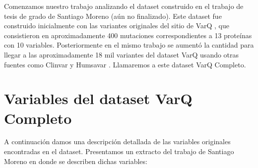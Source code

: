 
Comenzamos nuestro trabajo analizando el dataset construido en el trabajo de tesis de grado de Santiago Moreno (aún no finalizado). Este dataset fue construido inicialmente con las variantes originales del sitio de VarQ \cite{varq}, que consistieron en aproximadamente 400 mutaciones correspondientes a 13 proteínas con 10 variables. Posteriormente en el mismo trabajo se aumentó la cantidad para llegar a las aproximadamente 18 mil variantes del dataset VarQ usando otras fuentes como Clinvar \cite{clinvar} y Humsavar \cite{humsavar}. Llamaremos a este dataset VarQ Completo. 

\section{Variables del dataset VarQ Completo}

A continuación damos una descripción detallada de las variables originales encontradas en el dataset. Presentamos un extracto del trabajo de Santiago Moreno en donde se describen dichas variables: 

